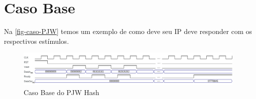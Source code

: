 \documentclass[
    12pt,
    a4paper,
    oneside,
    chapter=TITLE,
    section=TITLE,
    subsection=TITLE,
    subsubsection=TITLE,
    english,
    french,
    spanish,
    brazil,
    ]{abntex2}
\begin{document}
\chapter{Caso Base}
Na \autoref{fig-caso-PJW} temos um exemplo de como deve seu IP deve responder com os respectivos estímulos.

\begin{figure}[htb]
    \caption{\label{fig-caso-PJW}Caso Base do PJW Hash}
    \begin{center}
        \advance\leftskip-3cm
        \includegraphics[width=\paperwidth]{imgs/caso-PJW.png}
    \end{center}
\end{figure}
\end{document}
